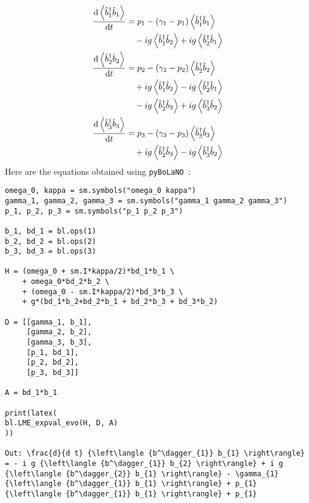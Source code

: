 \documentclass[5p, twocolumn, 10pt, sort&compress]{elsarticle}
\newcommand{\expval}[1]{\left\langle{#1}\right\rangle}
\newcommand{\bop}{\hat{b}}
\newcommand{\bdag}{\bop^\dagger}
\newcommand{\pybolano}{\texttt{pyBoLaNO}~}
\begin{document}
\begin{subequations}
\begin{align}
    \begin{split}
        \odv{\expval{\bdag_1\bop_1}}{t}
        &= p_1-\left(\gamma_1-p_1\right)\expval{\bdag_1\bop_1}
        \\ 
        &\quad -ig\expval{\bdag_1\bop_2}+ig\expval{\bdag_2\bop_1}
    \end{split}
    \\
    \begin{split}
    \odv{\expval{\bdag_2\bop_2}}{t} 
    &= 
    p_2 - \left(\gamma_2-p_2\right)\expval{\bdag_2\bop_2}
    \\ 
    &\quad +ig\expval{\bdag_1\bop_2}  -ig \expval{\bdag_2\bop_1}
    \\ 
    &\quad - ig\expval{\bdag_2\bop_3} + ig\expval{\bdag_3\bop_2}
    \end{split}
    \\
    \begin{split}
    \odv{\expval{\bdag_3\bop_3}}{t} 
    &= 
    p_3 - \left(\gamma_3-p_3\right) \expval{\bdag_3\bop_3}
    \\ 
    &\quad +ig\expval{\bdag_2\bop_3} - ig\expval{\bdag_3\bop_2}
    \end{split}
\end{align}
\end{subequations}
Here are the equations obtained using \pybolano:
\begin{verbatim}
omega_0, kappa = sm.symbols("omega_0 kappa")
gamma_1, gamma_2, gamma_3 = sm.symbols("gamma_1 gamma_2 gamma_3")
p_1, p_2, p_3 = sm.symbols("p_1 p_2 p_3")

b_1, bd_1 = bl.ops(1)
b_2, bd_2 = bl.ops(2)
b_3, bd_3 = bl.ops(3)

H = (omega_0 + sm.I*kappa/2)*bd_1*b_1 \
    + omega_0*bd_2*b_2 \
    + (omega_0 - sm.I*kappa/2)*bd_3*b_3 \
    + g*(bd_1*b_2+bd_2*b_1 + bd_2*b_3 + bd_3*b_2)
    
D = [[gamma_1, b_1],
     [gamma_2, b_2],
     [gamma_3, b_3],
     [p_1, bd_1],
     [p_2, bd_2],
     [p_3, bd_3]]

A = bd_1*b_1

print(latex(
bl.LME_expval_evo(H, D, A)
))

Out: \frac{d}{d t} {\left\langle {b^\dagger_{1}} b_{1} \right\rangle} = - i g {\left\langle {b^\dagger_{1}} b_{2} \right\rangle} + i g {\left\langle {b^\dagger_{2}} b_{1} \right\rangle} - \gamma_{1} {\left\langle {b^\dagger_{1}} b_{1} \right\rangle} + p_{1} {\left\langle {b^\dagger_{1}} b_{1} \right\rangle} + p_{1}
\end{verbatim}
\end{document}
